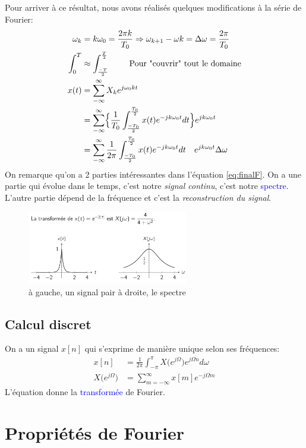 \documentclass{report}
\begin{document}
Pour arriver à ce résultat, nous avons réalisés quelques modifications à la série de Fourier:
\begin{align}
\omega_k &= k \omega_0 = \frac{2 \pi k}{T_0} \Rightarrow \omega_{k+1} - \omega{k} = \Delta \omega = \frac{2\pi}{T_0}\\
\int_0^{T} & \approx \int_{\frac{-T}{2}}^{\frac{T}{2}} \qquad \text{ Pour "couvrir" tout le domaine}\\
x(t) &= \sum_{-\infty}^{\infty} X_k e^{j \omega_0 k t}\\
	 &= \sum_{-\infty}^{\infty} \Bigl \{ \frac{1}{T_0} \int_{\frac{-T_0}{2}}^{\frac{T_0}{2}} x(t) e^{-j k \omega_0 t} dt \Bigl \} e^{j k \omega_0 t}\\
	 &= \sum_{-\infty}^{\infty} \frac{1}{2 \pi} \int_{\frac{-T_0}{2}}^{\frac{T_0}{2}} x(t) e^{-j k \omega_0 t} dt\quad e^{j k \omega_0 t} \Delta \omega \label{eq:finalF}
\end{align} 
On remarque qu'on a 2 parties intéressantes dans l'équation \ref{eq:finalF}. On a une partie qui évolue dans le temps, c'est notre \textit{signal continu}, c'est notre \textcolor{blue}{spectre}. L'autre partie dépend de la fréquence et c'est la \textit{reconstruction du signal}. 
\begin{figure}[H]
\centering
\includegraphics[width=7cm]{img/reconstructionF.png}
\caption{à gauche, un signal pair \qquad à droite, le spectre}
\end{figure}

\subsection{Calcul discret}
On a un signal $x[n]$ qui s'exprime de manière unique selon ses fréquences:
\begin{align}
x[n] &= \frac{1}{2\pi}\int_{-\pi}^{\pi} X \bigl(e^{j\Omega} \bigl) e^{j\Omega n} d\omega\\
X\bigl(e^{j\Omega} \bigl) &= \sum_{m=-\infty}^{\infty} x[m]e^{-j\Omega m} \label{eq:transfoDF}
\end{align}
L'équation \label{eq:transfoDF} donne la \textcolor{blue}{transformée} de Fourier.


\section{Propriétés de Fourier} \label{proprF}
\end{document}
